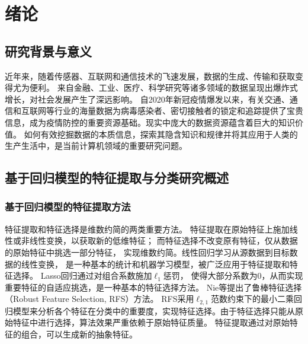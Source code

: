 \documentclass[master,oneside,winfonts]{njuthesis/njuthesis}
\begin{document}

\mainmatter
\chapter{绪论}\label{chapter_introduction}
\section{研究背景与意义}
近年来，随着传感器、互联网和通信技术的飞速发展，数据的生成、传输和获取变得尤为便利。
来自金融、工业、医疗、科学研究等诸多领域的数据呈现出爆炸式增长，对社会发展产生了深远影响。
自2020年新冠疫情爆发以来，有关交通、通信和互联网等行业的海量数据为病毒感染者、密切接触者的锁定和追踪提供了宝贵信息，成为疫情防控的重要资源基础。现实中庞大的数据资源蕴含着巨大的知识价值。
如何有效挖掘数据的本质信息，探索其隐含知识和规律并将其应用于人类的生产生活中，是当前计算机领域的重要研究问题。

\section{基于回归模型的特征提取与分类研究概述}
\subsection{基于回归模型的特征提取方法}
特征提取和特征选择是维数约简的两类重要方法。
特征提取在原始特征上施加线性或非线性变换，以获取新的低维特征；
而特征选择不改变原有特征，仅从数据的原始特征中挑选一部分特征，
实现维数约简。线性回归学习从源数据到目标数据的线性变换，
是一种基本的统计和机器学习模型，被广泛应用于特征提取和特征选择。
Lasso回归\cite{arjovskyWassersteinGAN2017}通过对组合系数施加$\ell_1$惩罚，
使得大部分系数为0，从而实现重要特征的自适应挑选，是一种基本的特征选择方法。
Nie等提出了鲁棒特征选择（Robust Feature Selection, RFS）\cite{nie2010efficient}方法。
RFS采用$\ell_{2,1}$范数约束下的最小二乘回归模型来分析各个特征在分类中的重要度，实现特征选择。由于特征选择只能从原始特征中进行选择，算法效果严重依赖于原始特征质量。
特征提取通过对原始特征的组合，可以生成新的抽象特征。

\end{document}

